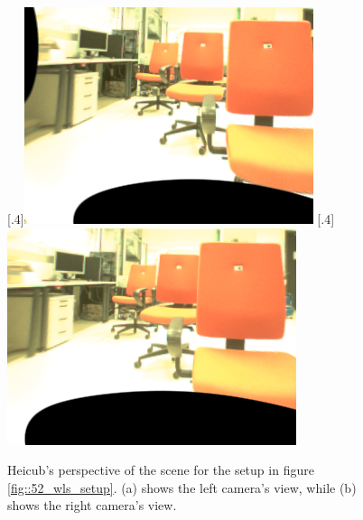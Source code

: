 \begin{figure}[h]
	\centering
	\subcaptionbox{}%
	[.4\linewidth]{\includegraphics[scale=.3]{chapters/05_experiments/img/l_rgb.png}}
	\subcaptionbox{}%
	[.4\linewidth]{\includegraphics[scale=.3]{chapters/05_experiments/img/r_rgb.png}}
	\caption{Heicub's perspective of the scene for the setup in figure \ref{fig::52_wls_setup}. (a) shows the left camera's view, while (b) shows the right camera's view.}
	\label{fig::52_wls_rgb}
\end{figure}

